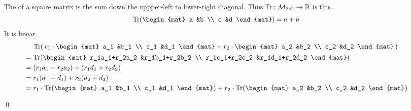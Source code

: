 \documentclass[10pt,t]{beamer}
\begin{document}
\begin{frame}
\ex
The  of a square matrix 
is the sum down the uppper-left to lower-right diagonal.
Thus
$\mbox{$\operatorname{Tr}\colon \mathcal{M}_{2 \! \times \! 2}\to \mathbb{R}$}$
is this.
\begin{equation*}
  \trace(\begin{mat}
    a &b \\
    c &d
  \end{mat})
  =a+b
\end{equation*}
It is linear.
\begin{multline*}
  \trace(\,
  r_1\cdot\begin{mat}
    a_1 &b_1 \\
    c_1 &d_1
  \end{mat}
  +
  r_2\cdot\begin{mat}
    a_2 &b_2 \\
    c_2 &d_2
  \end{mat}
  \,)                                              \\
  \begin{aligned}
    &=\trace(
      \begin{mat}
        r_1a_1+r_2a_2 &r_1b_1+r_2b_2 \\
        r_1c_1+r_2c_2 &r_1d_1+r_2d_2
      \end{mat}
      )                                       \\
    &=(r_1a_1+r_2a_2)+(r_1d_1+r_2d_2)         \\
    &=r_1(a_1+d_1)+r_2(a_2+d_2)               \\
    &=r_1\cdot\trace(
      \begin{mat}
        a_1 &b_1 \\
        c_1 &d_1
      \end{mat}
      )
      +
      r_2\cdot\trace(
      \begin{mat}
        a_2 &b_2 \\
        c_2 &d_2
      \end{mat}
      )
  \end{aligned} 
\end{multline*}
\end{frame}



\begin{frame}
\th[th:HomoDetActOnBasis]

\pause
\pf
{}

\pause
{}
\end{frame}
\begin{frame}
\qed
\end{frame}
\end{document}
